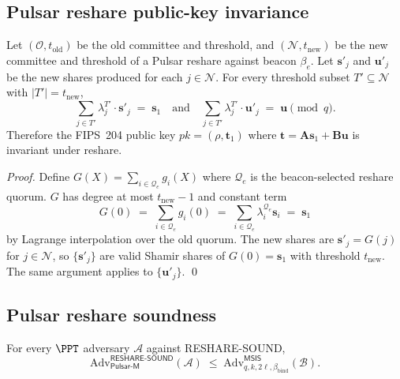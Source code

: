 
\subsection*{Pulsar reshare public-key invariance}

\begin{theorem}
\label{thm:pulsar-reshare-pkinv}
Let $(\mathcal{O}, t_{\mathrm{old}})$ be the old committee and
threshold, and $(\mathcal{N}, t_{\mathrm{new}})$ be the new committee
and threshold of a Pulsar reshare against beacon $\beta_e$. Let
$\mathbf{s}'_j$ and $\mathbf{u}'_j$ be the new shares produced for
each $j \in \mathcal{N}$. For every threshold subset $T' \subseteq
\mathcal{N}$ with $|T'| = t_{\mathrm{new}}$,
\[
  \sum_{j \in T'} \lambda_j^{T'} \cdot \mathbf{s}'_j \;=\; \mathbf{s}_1
  \quad\text{and}\quad
  \sum_{j \in T'} \lambda_j^{T'} \cdot \mathbf{u}'_j \;=\; \mathbf{u} \pmod q.
\]
Therefore the FIPS~204 public key $\mathit{pk} = (\rho, \mathbf{t}_1)$
where $\mathbf{t} = \mathbf{A} \mathbf{s}_1 + \mathbf{B} \mathbf{u}$
is invariant under reshare.
\end{theorem}

\begin{proof}
Define $G(X) = \sum_{i \in \mathcal{Q}_e} g_i(X)$ where
$\mathcal{Q}_e$ is the beacon-selected reshare quorum. $G$ has
degree at most $t_{\mathrm{new}} - 1$ and constant term
\[
  G(0) \;=\; \sum_{i \in \mathcal{Q}_e} g_i(0)
  \;=\; \sum_{i \in \mathcal{Q}_e} \lambda_i^{\mathcal{Q}_e} \mathbf{s}_i
  \;=\; \mathbf{s}_1
\]
by Lagrange interpolation over the old quorum. The new shares are
$\mathbf{s}'_j = G(j)$ for $j \in \mathcal{N}$, so
$\{\mathbf{s}'_j\}$ are valid Shamir shares of $G(0) = \mathbf{s}_1$
with threshold $t_{\mathrm{new}}$. The same argument applies to
$\{\mathbf{u}'_j\}$. \qed
\end{proof}

\subsection*{Pulsar reshare soundness}

\begin{theorem}
\label{thm:pulsar-reshare-sound}
For every $\PPT$ adversary $\mathcal{A}$ against RESHARE-SOUND,
\[
  \mathrm{Adv}^{\mathsf{RESHARE\text{-}SOUND}}_{\mathsf{Pulsar\text{-}M}}(\mathcal{A})
  \;\le\;
  \mathrm{Adv}^{\mathsf{MSIS}}_{q, k, 2\ell, \beta_{\mathrm{bind}}}(\mathcal{B}).
\]
\end{theorem}

